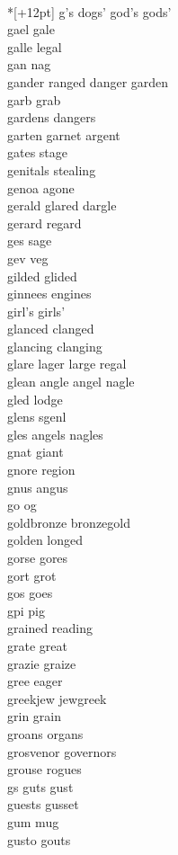 \vspace{14pt}
\noindent\notextbf{\LargeG}\\*[+12pt]
g's dogs' god's gods'  \\
gael gale\\
galle legal\\
gan nag\\
gander ranged danger garden\\
garb grab\\
gardens dangers\\
garten garnet argent\\
gates stage\\
genitals stealing\\
genoa agone\\
gerald glared dargle\\
gerard regard\\
ges sage \\
gev veg\\
gilded glided\\
ginnees engines\\
girl's girls'\\
glanced clanged\\
glancing clanging\\
glare lager large regal\\
glean angle angel nagle\\
gled lodge \\
glens sgenl\\
gles angels nagles  \\
gnat giant \\
gnore region \\
gnus angus \\
go og\\
goldbronze bronzegold\\
golden longed\\
gorse gores\\
gort grot\\
gos goes \\
gpi pig\\
grained reading\\
grate great\\
grazie graize\\
gree eager \\
greekjew jewgreek\\
grin grain \\
groans organs\\
grosvenor governors\\
grouse rogues\\
gs guts gust  \\
guests gusset\\
gum mug\\
gusto gouts\\

